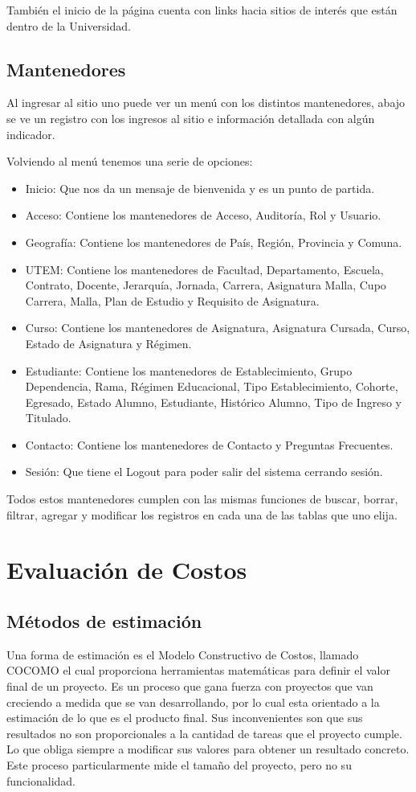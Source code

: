 \documentclass[a4paper,12pt,openany,oneside]{book}
\begin{document}
También el inicio de la página cuenta con links hacia sitios de interés que están dentro de la Universidad.
\section{Mantenedores}
Al ingresar al sitio uno puede ver un menú con los distintos mantenedores, abajo se ve un registro con los ingresos al sitio e información detallada con algún indicador.

Volviendo al menú tenemos una serie de opciones:

\begin{itemize}
	\item Inicio: Que nos da un mensaje de bienvenida y es un punto de partida.
	\item Acceso: Contiene los mantenedores de Acceso, Auditoría, Rol y Usuario.
	\item Geografía: Contiene los mantenedores de País, Región, Provincia y Comuna.
	\item UTEM: Contiene los mantenedores de Facultad, Departamento, Escuela, Contrato, Docente, Jerarquía, Jornada, Carrera, Asignatura Malla, Cupo Carrera, Malla, Plan de Estudio y Requisito de Asignatura.
	\item Curso: Contiene los mantenedores de Asignatura, Asignatura Cursada, Curso, Estado de Asignatura y Régimen.
	\item Estudiante: Contiene los mantenedores de Establecimiento, Grupo Dependencia, Rama, Régimen Educacional, Tipo Establecimiento, Cohorte, Egresado, Estado Alumno, Estudiante, Histórico Alumno, Tipo de Ingreso y Titulado.
	\item Contacto: Contiene los mantenedores de Contacto y Preguntas Frecuentes.
	\item Sesión: Que tiene el Logout para poder salir del sistema cerrando sesión.
\end{itemize}

Todos estos mantenedores cumplen con las mismas funciones de buscar, borrar, filtrar, agregar y modificar los registros en cada una de las tablas que uno elija.
\chapter{Evaluación de Costos}
\section{Métodos de estimación}
Una forma de estimación es el Modelo Constructivo de Costos, llamado COCOMO el cual proporciona herramientas matemáticas para definir el valor final de un proyecto. Es un proceso que gana fuerza con proyectos que van creciendo a medida que se van desarrollando, por lo cual esta orientado a la estimación de lo que es el producto final. Sus inconvenientes son que sus resultados no son proporcionales a la cantidad de tareas que el proyecto cumple. Lo que obliga siempre a modificar sus valores para obtener un resultado concreto. Este proceso particularmente mide el tamaño 
del proyecto, pero no su funcionalidad.
\end{document}
